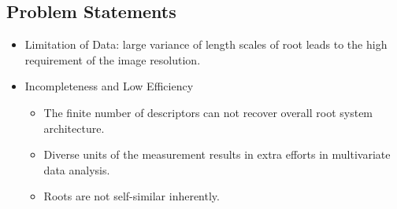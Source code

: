   \subsection{Problem Statements}
     \begin{itemize}
       \item Limitation of Data: large variance of length scales of root leads to the high requirement of the image resolution.
       \item Incompleteness and Low Efficiency
         \begin{itemize}
           \item The finite number of descriptors can not recover overall root system architecture.
           \item Diverse units of the measurement results in extra efforts in multivariate data analysis.
           \item Roots are not self-similar inherently.
         \end{itemize}
     \end{itemize}
     
